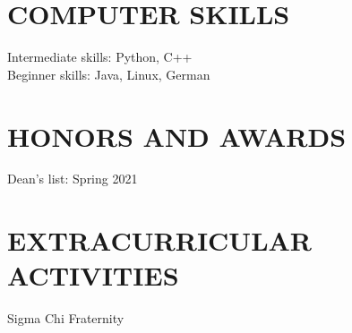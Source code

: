 \documentclass{res}
\begin{document}
\begin{resume}
\section{COMPUTER SKILLS}          
    Intermediate skills: Python, C++\\
    Beginner skills: Java, Linux, German          
 
 
\section{HONORS AND AWARDS}          
    Dean's list: Spring 2021         
 
\section{EXTRACURRICULAR ACTIVITIES}          
    Sigma Chi Fraternity         
 
\end{resume}
\end{document}
